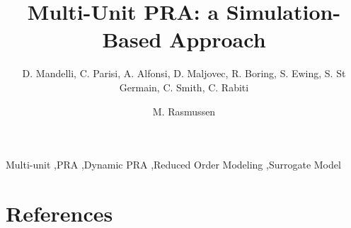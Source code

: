 \documentclass{elsarticle}
\begin{document}
\begin{frontmatter}

\title{Multi-Unit PRA: a Simulation-Based Approach}

\author{D. Mandelli, C. Parisi, A. Alfonsi, D. Maljovec, R. Boring, S. Ewing, S. St Germain, C. Smith, C. Rabiti}
\address{Idaho National Laboratory (INL), 2525 Fremont Ave, 83402 Idaho Falls (ID), USA}

\author{M. Rasmussen}
\address{Norwegian University of Science and Technology (NTNU), H\o gskoleringen 1, 7491 Trondheim, Norway}

\begin{abstract}
  
\end{abstract}

\begin{keyword}
Multi-unit \sep PRA \sep Dynamic PRA \sep Reduced Order Modeling \sep Surrogate Model
\end{keyword}

\end{frontmatter}

\linenumbers

\printnomenclature[1in]














\section*{References}


\end{document}
